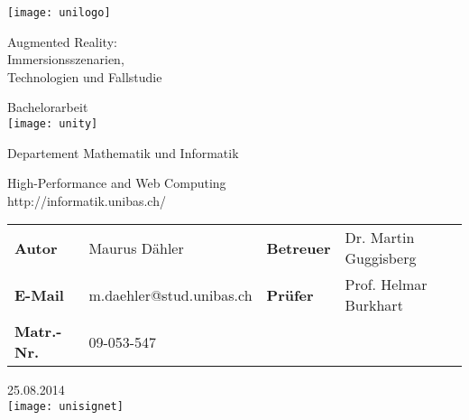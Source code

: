 
\pagestyle{empty}

\clearscrheadings\clearscrplain

\begin{center}
 \begin{flushleft}\texttt{[image: unilogo]}\end{flushleft}
\begin{Huge}
Augmented Reality:\\
Immersionsszenarien,\\
Technologien und Fallstudie\\
\vspace{3mm}
\end{Huge}{\Large Bachelorarbeit}\\
\vspace{0.5cm}
\texttt{[image: unity]}
\vspace{0.5cm}
\begin{Large}
Departement Mathematik und Informatik\\
\end{Large}
High-Performance and Web Computing\\
http://informatik.unibas.ch/\\
\vspace{0.5cm}
\begin{tabular}{llll}
{\bf Autor} & Maurus Dähler & {\bf Betreuer} & Dr. Martin Guggisberg\\
{\bf E-Mail} & m.daehler@stud.unibas.ch & {\bf Prüfer} & Prof. Helmar Burkhart\\
{\bf Matr.-Nr.} & 09-053-547\\
\end{tabular}


25.08.2014\\
\vspace{0.5cm}
\texttt{[image: unisignet]}


\end{center}
\clearpage


\pagestyle{useheadings} %
\renewcommand{\baselinestretch}{1.5}\normalsize

\tableofcontents
\listoffigures

